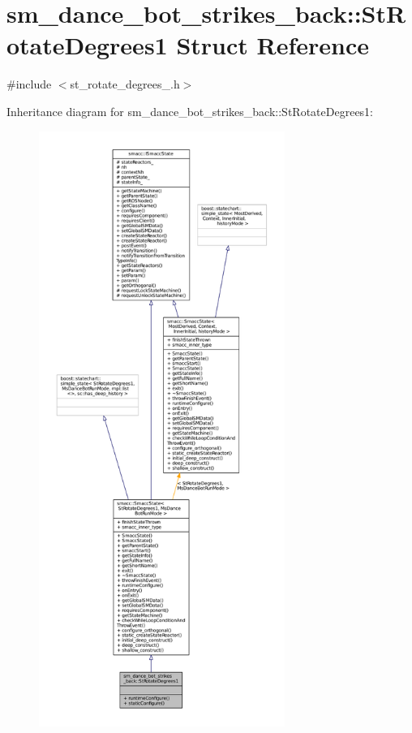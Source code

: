 \hypertarget{structsm__dance__bot__strikes__back_1_1StRotateDegrees1}{}\section{sm\+\_\+dance\+\_\+bot\+\_\+strikes\+\_\+back\+:\+:St\+Rotate\+Degrees1 Struct Reference}
\label{structsm__dance__bot__strikes__back_1_1StRotateDegrees1}


{\ttfamily \#include $<$st\+\_\+rotate\+\_\+degrees\+\_.\+h$>$}



Inheritance diagram for sm\+\_\+dance\+\_\+bot\+\_\+strikes\+\_\+back\+:\+:St\+Rotate\+Degrees1\+:
\nopagebreak
\begin{figure}[H]
\begin{center}
\leavevmode
\includegraphics[height=550pt]{structsm__dance__bot__strikes__back_1_1StRotateDegrees1__inherit__graph}
\end{center}
\end{figure}


